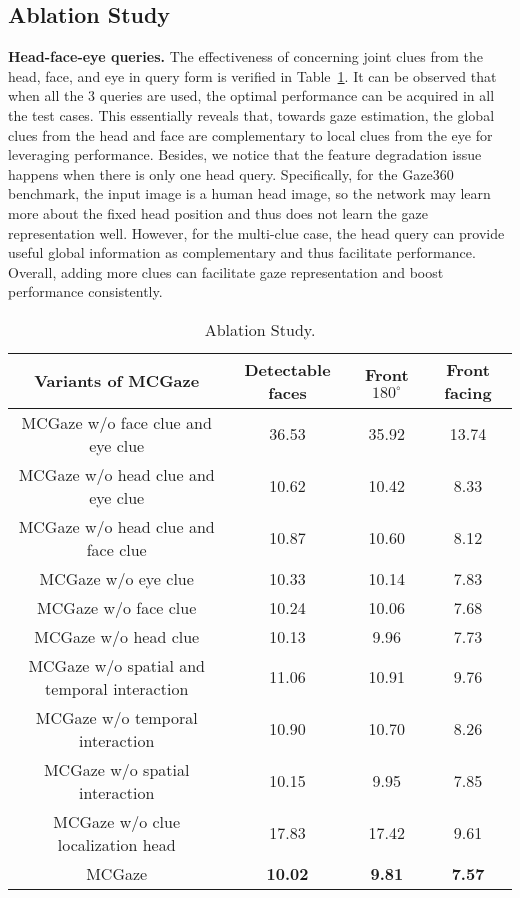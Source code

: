 \documentclass[journal]{IEEEtran}
\begin{document}
\subsection{Ablation Study}
\textbf{Head-face-eye queries.} The effectiveness of concerning joint clues from the head, face, and eye in query form is verified in Table~\ref{tab: ablation1}. It can be observed that when all the 3 queries are used, the optimal performance can be acquired in all the test cases. This essentially reveals that, towards gaze estimation, the global clues from the head and face are complementary to local clues from the eye for leveraging performance. Besides, we notice that the feature degradation issue happens when there is only one head query. Specifically, for the Gaze360 benchmark, the input image is a human head image, so the network may learn more about the fixed head position and thus does not learn the gaze representation well. However, for the multi-clue case, the head query can provide useful global information as complementary and thus facilitate performance. Overall, adding more clues can facilitate gaze representation and boost performance consistently. 
\begin{table}[t]
\tiny
\vspace{-6mm}
\setlength{\abovecaptionskip}{0cm}  \setlength{\belowcaptionskip}{-0.2cm} \caption{Ablation Study.}
\centering

\setlength{\tabcolsep}{3pt}
\begin{tabular}{c|ccc}
\hline
Variants of MCGaze& Detectable faces & Front$180^{\circ}$ & Front facing\\
\hline
 MCGaze w/o face clue and eye clue  & 36.53 & 35.92  & 13.74  \\
 MCGaze w/o head clue and eye clue  & 10.62 & 10.42 & 8.33 \\
 MCGaze w/o head clue and face clue  & 10.87 & 10.60 & 8.12 \\
 MCGaze w/o eye clue  & 10.33 & 10.14 & 7.83 \\
 MCGaze w/o face clue   & 10.24 & 10.06 & 7.68 \\
 MCGaze w/o head clue  & 10.13 & 9.96 & 7.73 \\
 \hline
 MCGaze w/o spatial and temporal interaction  & 11.06 & 10.91 & 9.76\\
 MCGaze w/o temporal interaction  & 10.90 & 10.70 & 8.26\\
 MCGaze w/o spatial interaction  & 10.15 & 9.95 & 7.85\\
 \hline
 MCGaze w/o clue localization head  & 17.83 & 17.42 & 9.61\\
 \hline
MCGaze & \textbf{10.02} & \textbf{9.81} & \textbf{7.57} \\
 \hline
\end{tabular}
\label{tab: ablation1}
\vspace{-6mm}
\end{table}
\end{document}
